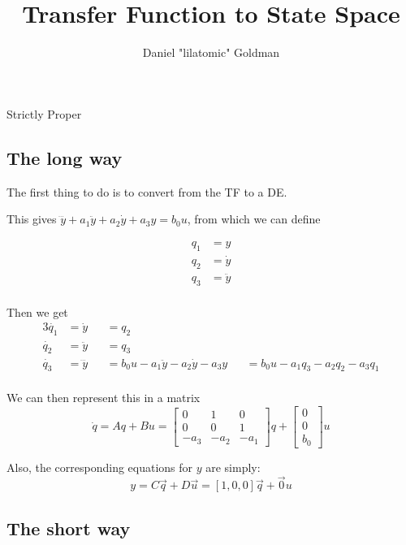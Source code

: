 \documentclass{../templates/topic}
\title{Transfer Function to State Space}
\author{Daniel "lilatomic" Goldman}
\begin{document}
\maketitle

\begin{section}{Strictly Proper}
	
	\subsection{The long way}
	
	The first thing to do is to convert from the TF to a DE.
	
	This gives $\dddot{y} + a_1\ddot{y} + a_2\dot{y} + a_3y = b_0u$, from which we can define
	
	\begin{align*}
		q_1 &= y \\
		q_2 &= \dot{y} \\
		q_3 &= \ddot{y} \\
	\end{align*}
		
	Then we get
	\begin{alignat*}{3}
		\dot{q_1}&=\dot{y}&&= q_2 &&\\
		\dot{q_2}&=\ddot{y}&&= q_3 &&\\
		\dot{q_3}&=\dddot{y}&&= b_0u - a_1\ddot{y} - a_2\dot{y} - a_3y &&= b_0u - a_1 q_3 - a_2 q_2 - a_3 q_1	\\
	\end{alignat*}
	
	We can then represent this in a matrix
	\[
	\dot{q}=Aq+Bu=
		\begin{bmatrix}
			0 & 1 & 0 \\
			0 & 0 & 1 \\
			-a_3 & -a_2 & -a_1
		\end{bmatrix}
		q +
		\begin{bmatrix}
			0 \\ 0 \\ b_0
		\end{bmatrix}
		u
	\]
	
	Also, the corresponding equations for $y$ are simply:
	\[
	y = C\vec{q}+D\vec{u}=[1, 0, 0]\vec{q} + \vec{0} u
	\]
	
	\subsection{The short way}
	

\end{section}
\end{document}
